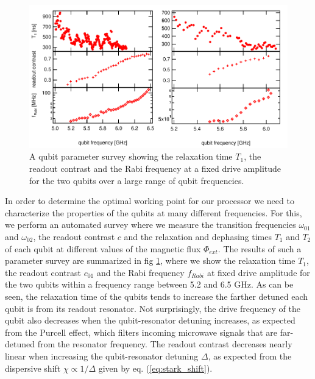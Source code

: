 \begin{figure}[ht!]
   \centering
	 \includegraphics[width=1\textwidth]{"./data/ct5/qubits - parameter surveys/qubit parameters"}
	 \caption[A qubit parameter survey showing $T_1$, readout contrast and Rabi frequency of the two qubits over a range of qubit frequencies]{A qubit parameter survey showing the relaxation time $T_1$, the readout contrast and the Rabi frequency at a fixed drive amplitude for the two qubits over a large range of qubit frequencies.}
	 \label{fig:qubit_parameters}
\end{figure}

In order to determine the optimal working point for our processor we need to characterize the properties of the qubits at many different frequencies. For this, we perform an automated survey where we measure the transition frequencies $\omega_{01}$ and $\omega_{02}$, the readout contrast $c$ and the relaxation and dephasing times $T_1$ and $T_2$ of each qubit at different values of the magnetic flux $\Phi_{ext}$. The results of such a parameter survey are summarized in fig \ref{fig:qubit_parameters}, where we show the relaxation time $T_1$,  the readout contrast $c_{01}$ and the Rabi frequency $f_{Rabi}$ at fixed drive amplitude for the two qubits within a frequency range between 5.2 and 6.5 GHz. As can be seen, the relaxation time of the qubits tends to increase the farther detuned each qubit is from its readout resonator. Not surprisingly, the drive frequency of the qubit also decreases when the qubit-resonator detuning increases, as expected from the Purcell effect, which filters incoming microwave signals that are far-detuned from the resonator frequency. The readout contrast decreases nearly linear when increasing the qubit-resonator detuning $\Delta$, as expected from the dispersive shift $\chi\propto 1/\Delta$ given by eq. (\ref{eq:stark_shift}).

